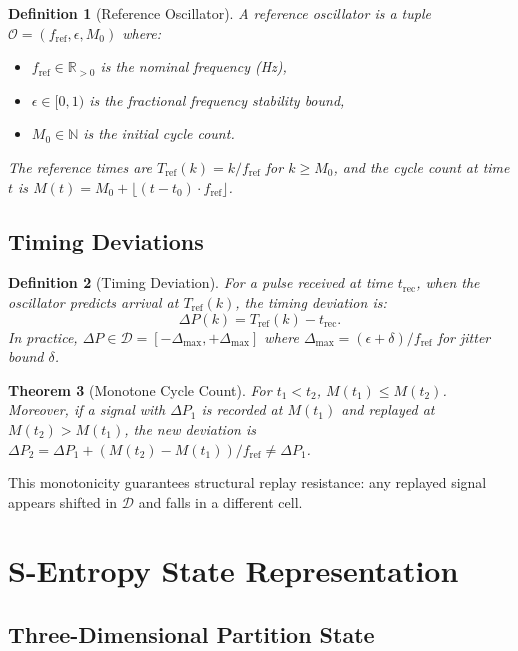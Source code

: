 \documentclass[twocolumn,11pt,a4paper]{article}
\newtheorem{theorem}{Theorem}[section]
\newtheorem{definition}[theorem]{Definition}
\newcommand{\DP}{\Delta P}
\newcommand{\calD}{\mathcal{D}}
\newcommand{\Tref}{T_{\mathrm{ref}}}
\newcommand{\trec}{t_{\mathrm{rec}}}
\newcommand{\fref}{f_{\mathrm{ref}}}
\newcommand{\Mcyc}{M}
\begin{document}
\begin{definition}[Reference Oscillator]
A \emph{reference oscillator} is a tuple $\mathcal{O} = (\fref, \epsilon, M_0)$ where:
\begin{itemize}[nosep,leftmargin=1em]
  \item $\fref \in \mathbb{R}_{>0}$ is the nominal frequency (Hz),
  \item $\epsilon \in [0,1)$ is the fractional frequency stability bound,
  \item $M_0 \in \mathbb{N}$ is the initial cycle count.
\end{itemize}
The reference times are $\Tref(k) = k/\fref$ for $k \geq M_0$, and the cycle count at time $t$ is $\Mcyc(t) = M_0 + \lfloor (t - t_0) \cdot \fref \rfloor$.
\end{definition}

\subsection{Timing Deviations}

\begin{definition}[Timing Deviation]
For a pulse received at time $\trec$, when the oscillator predicts arrival at $\Tref(k)$, the \emph{timing deviation} is:
\begin{equation}
  \DP(k) = \Tref(k) - \trec.
  \label{eq:dp-def}
\end{equation}
In practice, $\DP \in \calD = [-\Delta_{\max}, +\Delta_{\max}]$ where $\Delta_{\max} = (\epsilon + \delta)/\fref$ for jitter bound $\delta$.
\end{definition}

\begin{theorem}[Monotone Cycle Count]
For $t_1 < t_2$, $\Mcyc(t_1) \leq \Mcyc(t_2)$. Moreover, if a signal with $\DP_1$ is recorded at $\Mcyc(t_1)$ and replayed at $\Mcyc(t_2) > \Mcyc(t_1)$, the new deviation is $\DP_2 = \DP_1 + (\Mcyc(t_2) - \Mcyc(t_1))/\fref \neq \DP_1$.
\end{theorem}

This monotonicity guarantees structural replay resistance: any replayed signal appears shifted in $\calD$ and falls in a different cell.

\section{S-Entropy State Representation}
\label{sec:sentropy}

\subsection{Three-Dimensional Partition State}
\end{document}
